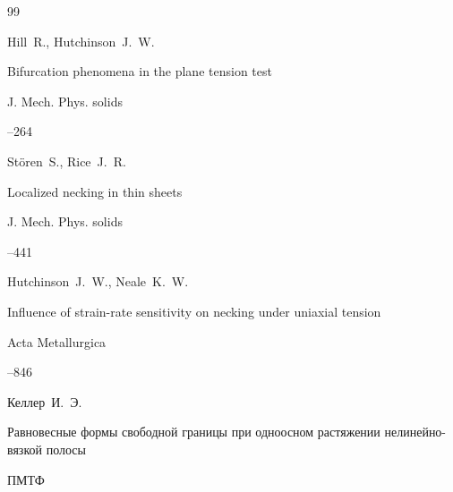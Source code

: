 \begin{thebibliography}{99}





\by Hill~R., Hutchinson~J.~W.

\paper Bifurcation phenomena in the plane tension test

\jour J. Mech. Phys. solids



--264






\by St\"oren~S., Rice~J.~R.

\paper Localized necking in thin sheets

\jour J. Mech. Phys. solids




--441






\by Hutchinson~J.~W., Neale~K.~W.

\paper Influence of strain-rate sensitivity on necking under uniaxial tension 

\jour Acta Metallurgica




--846








\by Келлер~И.~Э.

\paper Равновесные формы свободной границы при одноосном растяжении нелинейно-вязкой полосы

\jour ПМТФ


\end{thebibliography}
